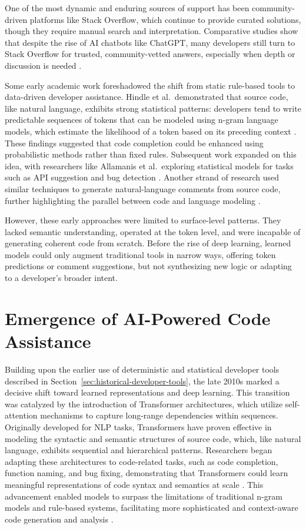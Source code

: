 One of the most dynamic and enduring sources of support has been community-driven platforms like Stack Overflow, which continue to provide curated solutions, though they require manual search and interpretation. Comparative studies show that despite the rise of \gls{AI} chatbots like ChatGPT, many developers still turn to Stack Overflow for trusted, community-vetted answers, especially when depth or discussion is needed \autocite{Liu2023Comparative}.

Some early academic work foreshadowed the shift from static rule-based tools to data-driven developer assistance. Hindle et al.\ demonstrated that source code, like natural language, exhibits strong statistical patterns: developers tend to write predictable sequences of tokens that can be modeled using n-gram language models, which estimate the likelihood of a token based on its preceding context \autocite{Hindle2012}. These findings suggested that code completion could be enhanced using probabilistic methods rather than fixed rules. Subsequent work expanded on this idea, with researchers like Allamanis et al.\ exploring statistical models for tasks such as API suggestion and bug detection \autocite{Allamanis2018}. Another strand of research used similar techniques to generate natural-language comments from source code, further highlighting the parallel between code and language modeling \autocite{MovshovitzAttias2013}.

However, these early approaches were limited to surface-level patterns. They lacked semantic understanding, operated at the token level, and were incapable of generating coherent code from scratch. Before the rise of deep learning, learned models could only augment traditional tools in narrow ways, offering token predictions or comment suggestions, but not synthesizing new logic or adapting to a developer’s broader intent.

\section{Emergence of AI-Powered Code Assistance}
\label{sec:emergence-ai-code-assistance}

Building upon the earlier use of deterministic and statistical developer tools described in Section~\ref{sec:historical-developer-tools}, the late 2010s marked a decisive shift toward learned representations and deep learning. This transition was catalyzed by the introduction of Transformer architectures, which utilize self-attention mechanisms to capture long-range dependencies within sequences. Originally developed for \gls{NLP} tasks, Transformers have proven effective in modeling the syntactic and semantic structures of source code, which, like natural language, exhibits sequential and hierarchical patterns. Researchers began adapting these architectures to code-related tasks, such as code completion, function naming, and bug fixing, demonstrating that Transformers could learn meaningful representations of code syntax and semantics at scale . This advancement enabled models to surpass the limitations of traditional n-gram models and rule-based systems, facilitating more sophisticated and context-aware code generation and analysis \autocite{Chirkova2021}.

